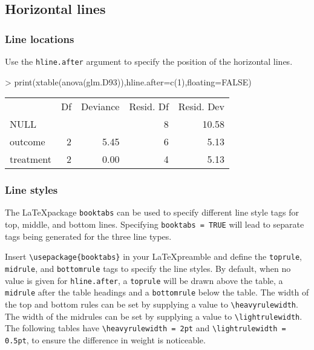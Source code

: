 \documentclass[letterpaper]{article}
\begin{document}
\subsection{Horizontal lines}

\subsubsection{Line locations}

Use the {\tt hline.after} argument to specify the position of the horizontal lines.

\begin{Schunk}
\begin{Sinput}
> print(xtable(anova(glm.D93)),hline.after=c(1),floating=FALSE)
\end{Sinput}
% latex table generated in R 3.1.1 by xtable 1.7-3 package
% 
\begin{tabular}{lrrrr}
  & Df & Deviance & Resid. Df & Resid. Dev \\ 
 NULL &  &  & 8 & 10.58 \\ 
   \hline
outcome & 2 & 5.45 & 6 & 5.13 \\ 
  treatment & 2 & 0.00 & 4 & 5.13 \\ 
  \end{tabular}\end{Schunk}

\subsubsection{Line styles}

The \LaTeX package {\tt booktabs} can be used to specify different
line style tags for top, middle, and bottom lines.  Specifying
{\tt booktabs = TRUE} will lead to separate tags being generated
for the three line types.

Insert \verb|\usepackage{booktabs}| in your \LaTeX preamble and define
the {\tt toprule}, {\tt midrule}, and {\tt bottomrule} tags to specify
the line styles. By default, when no value is given for
\texttt{hline.after}, a \texttt{toprule} will be drawn above the
table, a \texttt{midrule} after the table headings and a
\texttt{bottomrule} below the table. The width of the top and bottom
rules can be set by supplying a value to \verb+\heavyrulewidth+. The
width of the midrules can be set by supplying a value to
\verb+\lightrulewidth+. The following tables have
\verb+\heavyrulewidth = 2pt+ and \verb+\lightrulewidth = 0.5pt+, to
ensure the difference in weight is noticeable.
\end{document}
